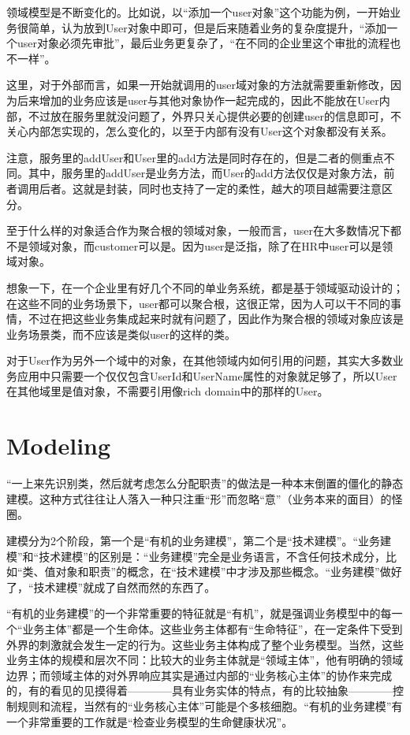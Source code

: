 领域模型是不断变化的。比如说，以“添加一个user对象”这个功能为例，一开始业务很简单，认为放到User对象中即可，但是后来随着业务的复杂度提升，“添加一个user对象必须先审批”，最后业务更复杂了，“在不同的企业里这个审批的流程也不一样”。

这里，对于外部而言，如果一开始就调用的user域对象的方法就需要重新修改，因为后来增加的业务应该是user与其他对象协作一起完成的，因此不能放在User内部，不过放在服务里就没问题了，外界只关心提供必要的创建user的信息即可，不关心内部怎实现的，怎么变化的，以至于内部有没有User这个对象都没有关系。

注意，服务里的addUser和User里的add方法是同时存在的，但是二者的侧重点不同。其中，服务里的addUser是业务方法，而User的add方法仅仅是对象方法，前者调用后者。这就是封装，同时也支持了一定的柔性，越大的项目越需要注意区分。

至于什么样的对象适合作为聚合根的领域对象，一般而言，user在大多数情况下都不是领域对象，而customer可以是。因为user是泛指，除了在HR中user可以是领域对象。

想象一下，在一个企业里有好几个不同的单业务系统，都是基于领域驱动设计的；在这些不同的业务场景下，user都可以聚合根，这很正常，因为人可以干不同的事情，不过在把这些业务集成起来时就有问题了，因此作为聚合根的领域对象应该是业务场景类，而不应该是类似user的这样的类。

对于User作为另外一个域中的对象，在其他领域内如何引用的问题，其实大多数业务应用中只需要一个仅仅包含UserId和UserName属性的对象就足够了，所以User在其他域里是值对象，不需要引用像rich domain中的那样的User。



\section{Modeling}


“一上来先识别类，然后就考虑怎么分配职责”的做法是一种本末倒置的僵化的静态建模。这种方式往往让人落入一种只注重“形”而忽略“意”（业务本来的面目）的怪圈。

建模分为2个阶段，第一个是“有机的业务建模”，第二个是“技术建模”。“业务建模”和“技术建模”的区别是：“业务建模”完全是业务语言，不含任何技术成分，比如“类、值对象和职责”的概念，在“技术建模”中才涉及那些概念。“业务建模”做好了，“技术建模”就成了自然而然的东西了。

“有机的业务建模”的一个非常重要的特征就是“有机”，就是强调业务模型中的每一个“业务主体”都是一个生命体。这些业务主体都有“生命特征”，在一定条件下受到外界的刺激就会发生一定的行为。这些业务主体构成了整个业务模型。当然，这些业务主体的规模和层次不同：比较大的业务主体就是“领域主体”，他有明确的领域边界；而领域主体的对外界响应其实是通过内部的“业务核心主体”的协作来完成的，有的看见的见摸得着————具有业务实体的特点，有的比较抽象————控制规则和流程，当然有的“业务核心主体”可能是个多核细胞。“有机的业务建模”有一个非常重要的工作就是“检查业务模型的生命健康状况”。

